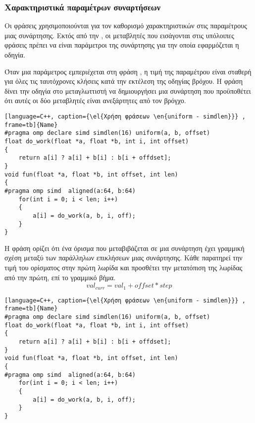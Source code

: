 \subsubsection{Χαρακτηριστικά παραμέτρων \emph{} συναρτήσεων}
Οι φράσεις \textbf{\emph{}} χρησιμοποιούνται για τον καθορισμό χαρακτηριστικών στις
παραμέτρους μιας \emph{} συνάρτησης. Εκτός από την \emph{}, οι μεταβλητές που εισάγονται
στις υπόλοιπες φράσεις πρέπει να είναι παράμετροι της συνάρτησης για την οποία εφαρμόζεται η οδηγία.

Όταν μια παράμετρος εμπεριέχεται στη φράση \emph{}, η τιμή της παραμέτρου είναι σταθερή για όλες τις
ταυτόχρονες κλήσεις κατά την εκτέλεση της οδηγίας \emph{} βρόχου. Η φράση \textbf{}
δίνει την οδηγία στο μεταγλωττιστή να δημιουργήσει μια \emph{} συνάρτηση που προϋποθέτει ότι αυτές οι δύο
μεταβλητές είναι ανεξάρτητες από τον βρόγχο. 

\begin{spacing}{0.9}
\begin{lstlisting}[language=C++, caption={\el{Χρήση φράσεων \en{uniform - simdlen}}} , frame=tb]{Name}
#pragma omp declare simd simdlen(16) uniform(a, b, offset)
float do_work(float *a, float *b, int i, int offset)
{
	return a[i] ? a[i] + b[i] : b[i + offdset];
}
void fun(float *a, float *b, int offset, int len)
{
#pragma omp simd  aligned(a:64, b:64)
	for(int i = 0; i < len; i++)
 	{
 		a[i] = do_work(a, b, i, off);
 	}
}

\end{lstlisting}
\end{spacing}


Η φράση \emph{} ορίζει ότι ένα όρισμα που μεταβιβάζεται σε μια συνάρτηση έχει γραμμική σχέση μεταξύ των
παράλληλων επικλήσεων μιας συνάρτησης. Κάθε \emph{} παρατηρεί την τιμή του ορίσματος στην πρώτη λωρίδα και
προσθέτει την μετατόπιση της \emph{} λωρίδας από την πρώτη, επί το γραμμικό βήμα.
$$val_{curr} = val_1 + offset * step $$


\begin{spacing}{0.8}
\begin{lstlisting}[language=C++, caption={\el{Χρήση φράσεων \en{uniform - simdlen}}} , frame=tb]{Name}
#pragma omp declare simd simdlen(16) uniform(a, b, offset)
float do_work(float *a, float *b, int i, int offset)
{
	return a[i] ? a[i] + b[i] : b[i + offdset];
}
void fun(float *a, float *b, int offset, int len)
{
#pragma omp simd  aligned(a:64, b:64)
	for(int i = 0; i < len; i++)
 	{
 		a[i] = do_work(a, b, i, off);
 	}
}

\end{lstlisting}
\end{spacing}


